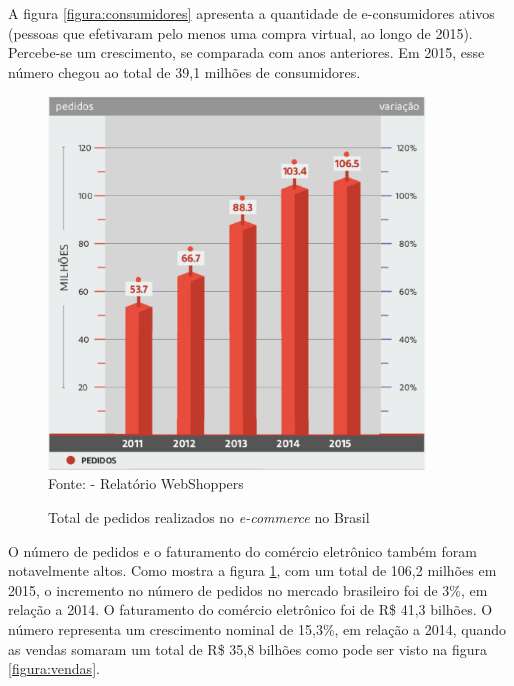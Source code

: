 \documentclass[a4paper,12pt]{monografia}
\begin{document}
A figura \ref{figura:consumidores} apresenta a quantidade de e-consumidores ativos (pessoas que efetivaram pelo
menos uma compra virtual, ao longo de 2015). Percebe-se um crescimento, se comparada com anos anteriores. Em 2015, esse número chegou ao total de 39,1 milhões de consumidores.

\begin{figure}[H]
\centering
\caption{Total de pedidos realizados no \textit{e-commerce} no Brasil}
\centering
\includegraphics[width=10cm]{img/webshoppers/total-pedidos.eps}\\
\small{Fonte:  - Relatório WebShoppers}
\label{figura:pedidos}
\end{figure}

O número de pedidos e o faturamento do comércio eletrônico também foram notavelmente altos. Como mostra a figura \ref{figura:pedidos}, com um total de 106,2 milhões em 2015, o incremento no número de pedidos no mercado brasileiro foi de 3\%, em relação a 2014. O faturamento do comércio eletrônico foi de R\$ 41,3 bilhões. O número representa um crescimento nominal de 15,3\%, em relação a 2014, quando as vendas somaram um total de R\$ 35,8 bilhões como pode ser visto na figura \ref{figura:vendas}.
\end{document}
